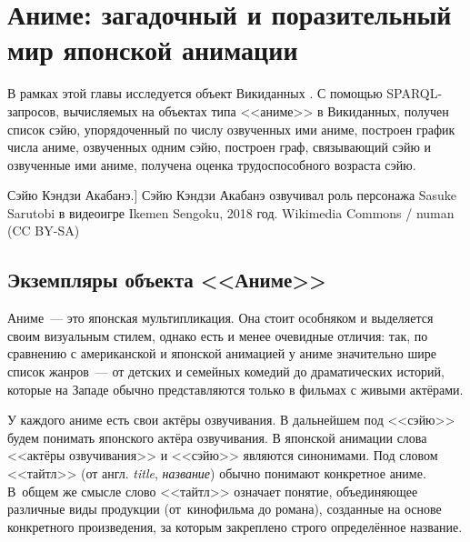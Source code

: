 
\chapter{Аниме: загадочный и поразительный мир японской анимации}
\label{ch:anime}
%

В рамках этой главы исследуется объект Викиданных . С помощью SPARQL-запросов, вычисляемых на объектах типа <<аниме>> в Викиданных, получен список сэйю, упорядоченный по числу озвученных ими аниме, построен график числа аниме, озвученных одним сэйю, построен граф, связывающий сэйю и озвученные ими аниме, получена оценка трудоспособного возраста сэйю. 

\begin{marginfigure}[0.0cm]
{
	\setlength{\fboxsep}{0pt}%
	\setlength{\fboxrule}{1pt}%
}
\caption
[Сэйю Кэндзи Акабанэ.]%
{%
Сэйю Кэндзи Акабанэ озвучивал роль персонажа Sasuke Sarutobi в видеоигре Ikemen Sengoku, 2018 год. 
Wikimedia Commons / numan (CC BY-SA)
}
\label{fig:seiyu}
\end{marginfigure}

\section{Экземпляры объекта <<Аниме>>}

Аниме~--- это японская мультипликация. Она стоит особняком и выделяется своим визуальным стилем, однако есть и менее очевидные отличия: так, по сравнению с американской и японской анимацией у аниме значительно шире список жанров~--- от детских и семейных комедий до драматических историй, которые на Западе обычно представляются только в фильмах с живыми актёрами\autocite{anime_vs_animation}.

У каждого аниме есть свои актёры озвучивания. 
В дальнейшем под <<сэйю>> будем понимать японского актёра озвучивания. 
В японской анимации слова <<актёры озвучивания>> и <<сэйю>> являются синонимами\autocite{shikimori}. 
Под словом <<тайтл>> (от англ. \emph{title}, \emph{название}) обычно понимают конкретное аниме\autocite{anime_social}. 
В~общем же смысле слово <<тайтл>> означает понятие, объединяющее различные виды продукции 
(от~кинофильма до романа), созданные на основе конкретного произведения, за которым закреплено строго определённое название\autocite{anime_title_def}.

